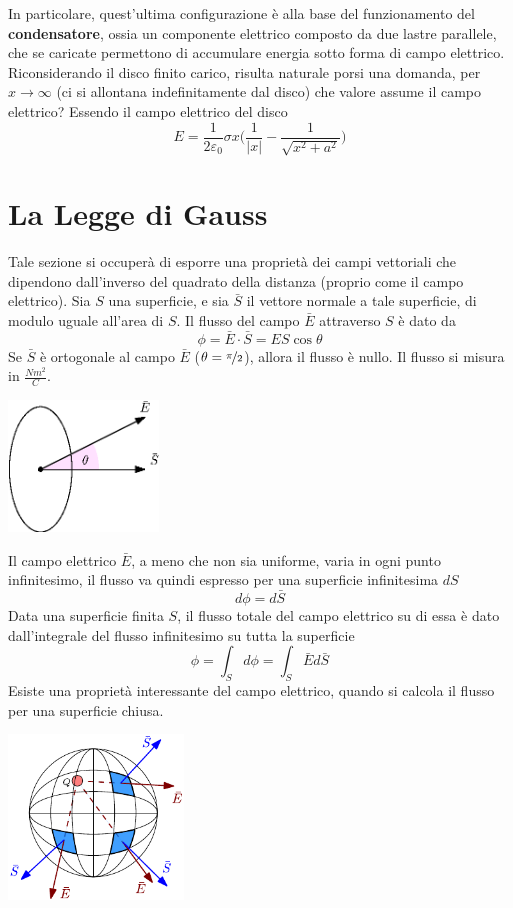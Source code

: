 \documentclass[10pt, letterpaper]{report}
\begin{document}
In particolare, quest'ultima configurazione è alla base del funzionamento del \textbf{condensatore}, ossia un componente elettrico composto da due lastre parallele, che se caricate permettono di accumulare energia sotto forma di campo elettrico.\acc 
Riconsiderando il disco finito carico, risulta naturale porsi una domanda, per $x\rightarrow \infty$ (ci si allontana indefinitamente dal disco) che valore assume il campo elettrico? Essendo il campo elettrico del disco 
$$ E=\frac{1}{2\varepsilon_0}\sigma x\Big( \frac{1}{|x|}-\frac{1}{\sqrt{x^2+a^2}} \Big)$$
\flowerLine 
\section{La Legge di Gauss}
Tale sezione si occuperà di esporre una proprietà dei campi vettoriali che dipendono dall'inverso del quadrato della distanza (proprio come il campo elettrico).\acc 
{} Sia $S$ una superficie, e sia $\bar S$ il vettore normale a tale superficie, di modulo uguale all'area di $S$. Il flusso del campo $\bar E$ attraverso $S$ è dato da 
$$ \phi=\bar E\cdot \bar S=ES\cos\theta$$
Se  $\bar S$ è ortogonale al campo $\bar E$ ($\theta = \nicefrac{\pi}{2}$), allora il flusso è nullo. Il flusso si misura in $\frac{Nm^2}{C}$.  \begin{center}
    \includegraphics[width=0.3\textwidth]{images/flusso.eps}
\end{center}
Il campo elettrico $\bar E$, a meno che non sia uniforme, varia in ogni punto infinitesimo, il flusso va quindi espresso per una superficie infinitesima $dS$
$$ d\phi=d\bar S$$
Data una superficie finita $S$, il flusso totale del campo elettrico su di essa è dato dall'integrale del flusso infinitesimo su tutta la superficie 
$$ \phi = \int_S d\phi = \int_S \bar Ed\bar S$$
Esiste una proprietà interessante del campo elettrico, quando si calcola il flusso per una superficie chiusa. \begin{center}
    \includegraphics[width=0.35\textwidth]{images/flussoCampo2.pdf}
\end{center}
\end{document}
